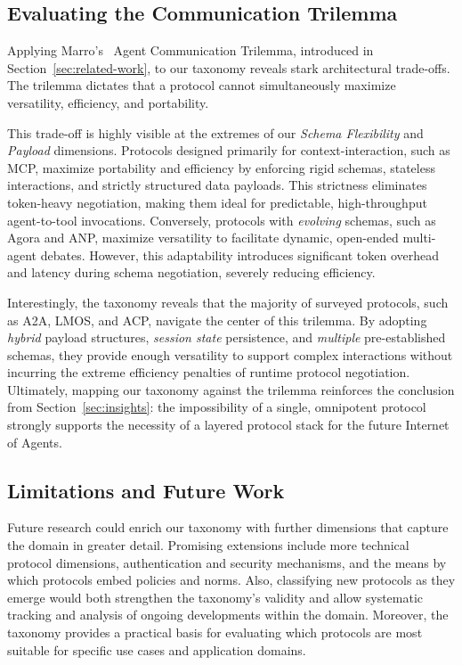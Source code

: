 \documentclass[pdflatex,sn-mathphys-num]{sn-jnl}%
\theoremstyle{thmstyleone}%
\theoremstyle{thmstyletwo}%
\theoremstyle{thmstylethree}%
\begin{document}
\subsection{Evaluating the Communication Trilemma}

Applying Marro's~\cite{marro2024scalable} Agent Communication Trilemma, introduced in Section~\ref{sec:related-work}, to our taxonomy reveals stark architectural trade-offs. The trilemma dictates that a protocol cannot simultaneously maximize versatility, efficiency, and portability. 

This trade-off is highly visible at the extremes of our \textit{Schema Flexibility} and \textit{Payload} dimensions. Protocols designed primarily for context-interaction, such as MCP, maximize portability and efficiency by enforcing rigid schemas, stateless interactions, and strictly structured data payloads. This strictness eliminates token-heavy negotiation, making them ideal for predictable, high-throughput agent-to-tool invocations. Conversely, protocols with \textit{evolving} schemas, such as Agora and ANP, maximize versatility to facilitate dynamic, open-ended multi-agent debates. However, this adaptability introduces significant token overhead and latency during schema negotiation, severely reducing efficiency.

Interestingly, the taxonomy reveals that the majority of surveyed protocols, such as A2A, LMOS, and ACP, navigate the center of this trilemma. By adopting \textit{hybrid} payload structures, \textit{session state} persistence, and \textit{multiple} pre-established schemas, they provide enough versatility to support complex interactions without incurring the extreme efficiency penalties of runtime protocol negotiation. Ultimately, mapping our taxonomy against the trilemma reinforces the conclusion from Section~\ref{sec:insights}: the impossibility of a single, omnipotent protocol strongly supports the necessity of a layered protocol stack for the future Internet of Agents.

\subsection{Limitations and Future Work} 

Future research could enrich our taxonomy with further dimensions that capture the domain in greater detail. Promising extensions include more technical protocol dimensions, authentication and security mechanisms, and the means by which protocols embed policies and norms. Also, classifying new protocols as they emerge would both strengthen the taxonomy's validity and allow systematic tracking and analysis of ongoing developments within the domain. Moreover, the taxonomy provides a practical basis for evaluating which protocols are most suitable for specific use cases and application domains.
\end{document}
